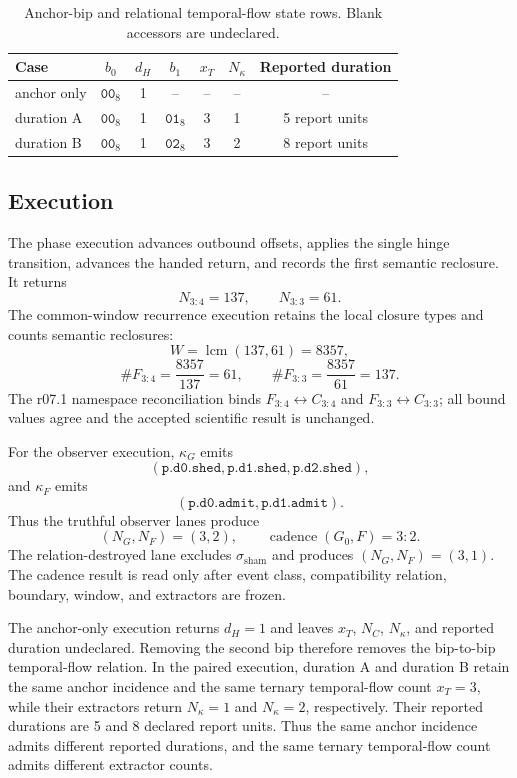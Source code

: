 \begin{table}[H]
\centering
\small
\caption{Anchor-bip and relational temporal-flow state rows. Blank accessors
are undeclared.}
\begin{tabular}{lcccccc}
\toprule
Case & \(b_0\) & \(d_H\) & \(b_1\) & \(x_T\) & \(N_\kappa\) & Reported duration\\
\midrule
anchor only & \(\mathtt{00}_8\) & 1 & -- & -- & -- & --\\
duration A & \(\mathtt{00}_8\) & 1 & \(\mathtt{01}_8\) & 3 & 1 & 5 report units\\
duration B & \(\mathtt{00}_8\) & 1 & \(\mathtt{02}_8\) & 3 & 2 & 8 report units\\
\bottomrule
\end{tabular}
\label{tab:manual-anchor-bip-temporal-state}
\end{table}

\subsection{Execution}\label{manual:phase-temporal:execution}
The phase execution advances outbound offsets, applies the single hinge transition, advances the handed return, and records the first semantic reclosure. It returns
\[
N_{3:4}=137,
\qquad
N_{3:3}=61.
\]
The common-window recurrence execution retains the local closure types and counts semantic reclosures:
\[
W=\operatorname{lcm}(137,61)=8357,
\]
\[
\#F_{3:4}=\frac{8357}{137}=61,
\qquad
\#F_{3:3}=\frac{8357}{61}=137.
\]
The r07.1 namespace reconciliation binds \(F_{3:4}\leftrightarrow C_{3:4}\) and \(F_{3:3}\leftrightarrow C_{3:3}\); all bound values agree and the accepted scientific result is unchanged.

For the observer execution, \(\kappa_G\) emits
\[
(\texttt{p.d0.shed},\texttt{p.d1.shed},\texttt{p.d2.shed}),
\]
and \(\kappa_F\) emits
\[
(\texttt{p.d0.admit},\texttt{p.d1.admit}).
\]
Thus the truthful observer lanes produce
\[
(N_G,N_F)=(3,2),
\qquad
\operatorname{cadence}(G_0,F)=3{:}2.
\]
The relation-destroyed lane excludes \(\sigma_{\mathrm{sham}}\) and produces \((N_G,N_F)=(3,1)\). The cadence result is read only after event class, compatibility relation, boundary, window, and extractors are frozen.

The anchor-only execution returns \(d_H=1\) and leaves \(x_T\),
\(N_C\), \(N_\kappa\), and reported duration undeclared. Removing the
second bip therefore removes the bip-to-bip temporal-flow relation. In the
paired execution, duration A and duration B retain the same anchor
incidence and the same ternary temporal-flow count \(x_T=3\), while their
extractors return \(N_\kappa=1\) and \(N_\kappa=2\), respectively. Their
reported durations are 5 and 8 declared report units. Thus the same
anchor incidence admits different reported durations, and the same
ternary temporal-flow count admits different extractor counts.

